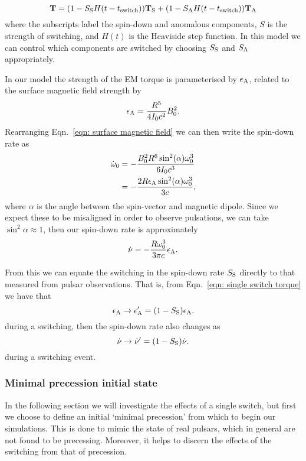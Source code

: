 \documentclass[../full_thesis/full_thesis.tex]{subfiles}
\begin{document}
\begin{equation}
\mathbf{T} = (1 - S_{\mathrm{S}} H(t-t_{\mathrm{switch}})) \mathbf{T}_{\mathrm{S}}+
                 (1 - S_{\mathrm{A}} H(t-t_{\mathrm{switch}})) \mathbf{T}_{\mathrm{A}}
\label{eqn: single switch torque}
\end{equation}
where the subscripts label the spin-down and anomalous components, $S$ is the
strength of switching, and $H(t)$ is the Heaviside step function. In this model
we can control which components are switched by choosing $S_{\mathrm{S}}$ and $S_{\mathrm{A}}$
appropriately.

In our model the strength of the EM torque is parameterised
by $\epsilon_{\mathrm{A}}$, related to the surface magnetic field strength by
\begin{align}
    \epsilon_{\mathrm{A}} = \frac{R^{5}}{4I_{0} c^{2}} B_{0}^{2}.
\end{align}
Rearranging Eqn.~\eqref{eqn: surface magnetic field} we can then write the
spin-down rate as
\begin{align}
    \dot{\omega}_{0} & = -\frac{B_{0}^{2}R^{6} \sin^{2}(\alpha) \omega_{0}^{3}}{6 I_{0} c^{3}} \\
    & = - \frac{2 R \epsilon_{\mathrm{A}} \sin^{2}(\alpha) \omega_{0}^{3}}{3 c},
\end{align}
where $\alpha$ is the angle between the spin-vector and magnetic dipole. Since
we expect these to be misaligned in order to observe pulsations, we can take
$\sin^{2}\alpha \approx 1$, then our spin-down rate is approximately
\begin{equation}
    \dot{\nu} = - \frac{R\omega_{0}^{3}}{3\pi c}\epsilon_{\mathrm{A}}.
    \label{eqn: spin-down of epsA}
\end{equation}

From this we can equate the switching in the spin-down rate $S_{\mathrm{S}}$ directly to
that measured from pulsar observations. That is, from Eqn.~\eqref{eqn: single switch torque}
we have that
\begin{equation}
    \epsilon_{\mathrm{A}} \rightarrow \epsilon_{\mathrm{A}}' = (1-S_{\mathrm{S}})\epsilon_{\mathrm{A}}.
\label{eqn: epsA switch}
\end{equation}
during a switching, then the spin-down rate also changes as
\begin{equation}
    \dot{\nu} \rightarrow \dot{\nu}' = (1-S_{\mathrm{S}})\dot{\nu}.
\label{eqn: nudot switch}
\end{equation}
during a switching event.

\subsubsection{Minimal precession initial state}
In the following section we will investigate the effects of a single switch, but
first we choose to define an initial `minimal precession' from which to begin
our simulations. This is done to mimic the state of real pulsars, which in
general are not found to be precessing. Moreover, it helps to discern the
effects of the switching from that of precession.
\end{document}

